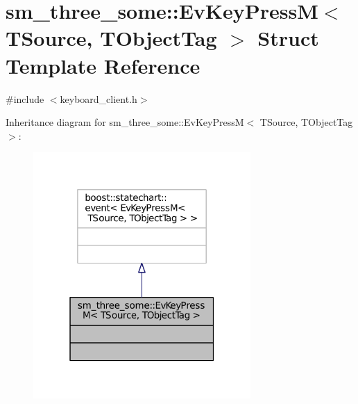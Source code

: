 \hypertarget{structsm__three__some_1_1EvKeyPressM}{}\section{sm\+\_\+three\+\_\+some\+:\+:Ev\+Key\+PressM$<$ T\+Source, T\+Object\+Tag $>$ Struct Template Reference}
\label{structsm__three__some_1_1EvKeyPressM}


{\ttfamily \#include $<$keyboard\+\_\+client.\+h$>$}



Inheritance diagram for sm\+\_\+three\+\_\+some\+:\+:Ev\+Key\+PressM$<$ T\+Source, T\+Object\+Tag $>$\+:
\nopagebreak
\begin{figure}[H]
\begin{center}
\leavevmode
\includegraphics[width=235pt]{structsm__three__some_1_1EvKeyPressM__inherit__graph}
\end{center}
\end{figure}



